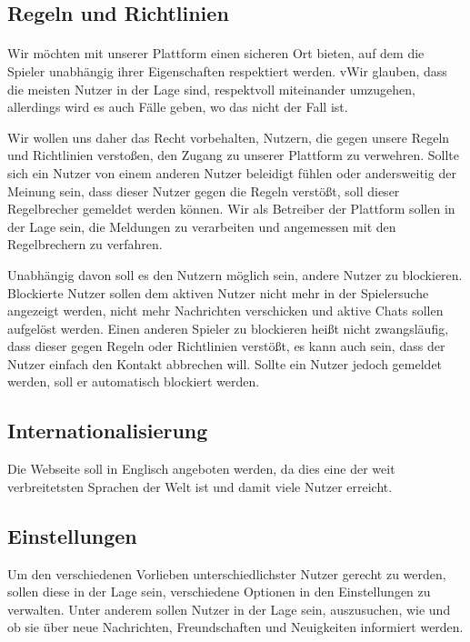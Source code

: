 \subsection{Regeln und Richtlinien}
\paragraph{}
Wir möchten mit unserer Plattform einen sicheren Ort bieten, auf dem die Spieler unabhängig ihrer Eigenschaften respektiert werden. vWir glauben, dass die meisten Nutzer in der Lage sind, respektvoll miteinander umzugehen, allerdings wird es auch Fälle geben, wo das nicht der Fall ist.

Wir wollen uns daher das Recht vorbehalten, Nutzern, die gegen unsere Regeln und Richtlinien verstoßen, den Zugang zu unserer Plattform zu verwehren. Sollte sich ein Nutzer von einem anderen Nutzer beleidigt fühlen oder andersweitig der Meinung sein, dass dieser Nutzer gegen die Regeln verstößt, soll dieser Regelbrecher gemeldet werden können. Wir als Betreiber der Plattform sollen in der Lage sein, die Meldungen zu verarbeiten und angemessen mit den Regelbrechern zu verfahren.

Unabhängig davon soll es den Nutzern möglich sein, andere Nutzer zu blockieren. Blockierte Nutzer sollen dem aktiven Nutzer nicht mehr in der Spielersuche angezeigt werden, nicht mehr Nachrichten verschicken und aktive Chats sollen aufgelöst werden. Einen anderen Spieler zu blockieren heißt nicht zwangsläufig, dass dieser gegen Regeln oder Richtlinien verstößt, es kann auch sein, dass der Nutzer einfach den Kontakt abbrechen will. Sollte ein Nutzer jedoch gemeldet werden, soll er automatisch blockiert werden.

\subsection{Internationalisierung}
Die Webseite soll in Englisch angeboten werden, da dies eine der weit verbreitetsten Sprachen der Welt ist und damit viele Nutzer erreicht.

\subsection{Einstellungen}
Um den verschiedenen Vorlieben unterschiedlichster Nutzer gerecht zu werden, sollen diese in der Lage sein, verschiedene Optionen in den Einstellungen zu verwalten. Unter anderem sollen Nutzer in der Lage sein, auszusuchen, wie und ob sie über neue Nachrichten, Freundschaften und Neuigkeiten informiert werden.

